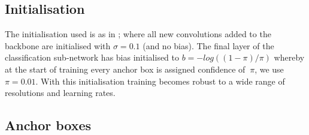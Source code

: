 \subsection{Initialisation}

The initialisation used is as in \cite{Lin2017}; where all new convolutions added to the backbone are initialised with $\sigma=0.1$ (and no bias). The final layer of the classification sub-network has bias initialised to $b = −log((1 − \pi)/\pi) $ whereby at the start of training every anchor box is assigned confidence of $~\pi$, we use $\pi=0.01$. With this initialisation training becomes robust to a wide range of resolutions and learning rates.

\subsection{Anchor boxes}

